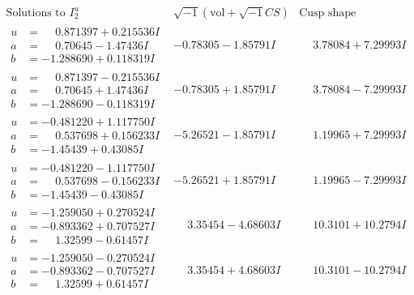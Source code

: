 \documentclass[1p]{elsarticle_modified}
\theoremstyle{definition}
\newcommand{\I}{\sqrt{-1}}
\begin{document}
$$\begin{array}{c|c|c}  
\text{Solutions to }I^u_{2}& \I (\text{vol} + \sqrt{-1}CS) & \text{Cusp shape}\\
 \hline 
\begin{aligned}
u &= \phantom{-}0.871397 + 0.215536 I \\
a &= \phantom{-}0.70645 - 1.47436 I \\
b &= -1.288690 + 0.118319 I\end{aligned}
 & -0.78305 - 1.85791 I & \phantom{-}3.78084 + 7.29993 I \\ \hline\begin{aligned}
u &= \phantom{-}0.871397 - 0.215536 I \\
a &= \phantom{-}0.70645 + 1.47436 I \\
b &= -1.288690 - 0.118319 I\end{aligned}
 & -0.78305 + 1.85791 I & \phantom{-}3.78084 - 7.29993 I \\ \hline\begin{aligned}
u &= -0.481220 + 1.117750 I \\
a &= \phantom{-}0.537698 + 0.156233 I \\
b &= -1.45439 + 0.43085 I\end{aligned}
 & -5.26521 - 1.85791 I & \phantom{-}1.19965 + 7.29993 I \\ \hline\begin{aligned}
u &= -0.481220 - 1.117750 I \\
a &= \phantom{-}0.537698 - 0.156233 I \\
b &= -1.45439 - 0.43085 I\end{aligned}
 & -5.26521 + 1.85791 I & \phantom{-}1.19965 - 7.29993 I \\ \hline\begin{aligned}
u &= -1.259050 + 0.270524 I \\
a &= -0.893362 + 0.707527 I \\
b &= \phantom{-}1.32599 - 0.61457 I\end{aligned}
 & \phantom{-}3.35454 - 4.68603 I & \phantom{-}10.3101 + 10.2794 I \\ \hline\begin{aligned}
u &= -1.259050 - 0.270524 I \\
a &= -0.893362 - 0.707527 I \\
b &= \phantom{-}1.32599 + 0.61457 I\end{aligned}
 & \phantom{-}3.35454 + 4.68603 I & \phantom{-}10.3101 - 10.2794 I \\ \hline\begin{aligned}

\end{aligned}
\end{array}$$
\end{document}
